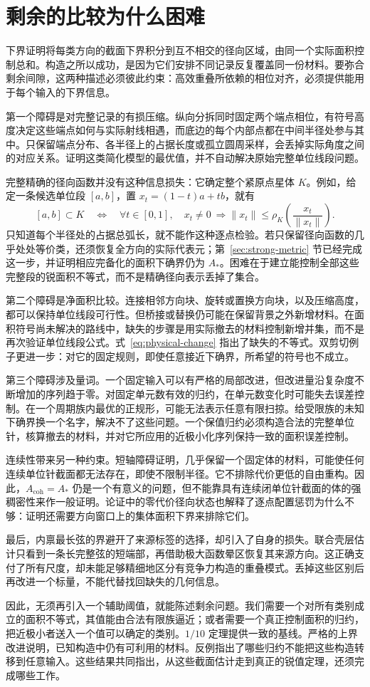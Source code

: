 \section{剩余的比较为什么困难}\label{sec:difficulty}
下界证明将每类方向的截面下界积分到互不相交的径向区域，由同一个实际面积控制总和。构造之所以成功，是因为它们安排不同记录反复覆盖同一份材料。要弥合剩余间隙，这两种描述必须彼此约束：高效重叠所依赖的相位对齐，必须提供能用于每个输入的下界信息。

第一个障碍是对完整记录的有损压缩。纵向分拆同时固定两个端点相位，有符号高度决定这些端点如何与实际射线相遇，而底边的每个内部点都在中间半径处参与其中。只保留端点分布、各半径上的占据长度或孤立圆周采样，会丢掉实际角度之间的对应关系。证明这类简化模型的最优值，并不自动解决原始完整单位线段问题。

完整精确的径向函数并没有这种信息损失：它确定整个紧原点星体 $K$。例如，给定一条候选单位段 $[a,b]$，置 $x_t=(1-t)a+tb$，就有
\[
 [a,b]\subset K\quad\Longleftrightarrow\quad
 \forall t\in[0,1],\quad x_t\ne0\ \Longrightarrow
 \|x_t\|\le\rho_K\!\left(\frac{x_t}{\|x_t\|}\right).
\]
只知道每个半径处的占据总弧长，就不能作这种逐点检验。若只保留径向函数的几乎处处等价类，还须恢复全方向的实际代表元；第~\ref{sec:strong-metric} 节已经完成这一步，并证明相应完备化的面积下确界仍为 $A_*$。困难在于建立能控制全部这些完整段的锐面积不等式，而不是精确径向表示丢掉了集合。

第二个障碍是净面积比较。连接相邻方向块、旋转或置换方向块，以及压缩高度，都可以保持单位线段可行性。但桥接或替换仍可能在保留背景之外新增材料。在面积符号尚未解决的路线中，缺失的步骤是用实际撤去的材料控制新增并集，而不是再次验证单位线段公式。式~\eqref{eq:physical-change} 指出了缺失的不等式。双剪切例子更进一步：对它的固定规则，即使任意接近下确界，所希望的符号也不成立。

第三个障碍涉及量词。一个固定输入可以有严格的局部改进，但改进量沿复杂度不断增加的序列趋于零。对固定单元数有效的归约，在单元数变化时可能失去误差控制。在一个周期族内最优的正规形，可能无法表示任意有限扫掠。给受限族的未知下确界换一个名字，解决不了这些问题。一个保值归约必须构造合法的完整单位针，核算撤去的材料，并对它所应用的近极小化序列保持一致的面积误差控制。

连续性带来另一种约束。短轴障碍证明，几乎保留一个固定体的材料，可能使任何连续单位针截面都无法存在，即使不限制半径。它不排除代价更低的自由重构。因此，$A_{\mathrm{coh}}=A_*$ 仍是一个有意义的问题，但不能靠具有连续闭单位针截面的体的强稠密性来作一般证明。论证中的零代价径向状态也解释了逐点配置惩罚为什么不够：证明还需要方向窗口上的集体面积下界来排除它们。

最后，内禀最长弦的界避开了来源标签的选择，却引入了自身的损失。联合壳层估计只看到一条长完整弦的短端部，再借助极大函数晕区恢复其来源方向。这正确支付了所有尺度，却未能足够精细地区分有竞争力构造的重叠模式。丢掉这些区别后再改进一个标量，不能代替找回缺失的几何信息。

因此，无须再引入一个辅助阈值，就能陈述剩余问题。我们需要一个对所有类别成立的面积不等式，其值能由合法有限族逼近；或者需要一个真正控制面积的归约，把近极小者送入一个值可以确定的类别。$1/10$ 定理提供一致的基线。严格的上界改进说明，已知构造中仍有可利用的材料。反例指出了哪些归约不能把这些构造转移到任意输入。这些结果共同指出，从这些截面估计走到真正的锐值定理，还须完成哪些工作。
